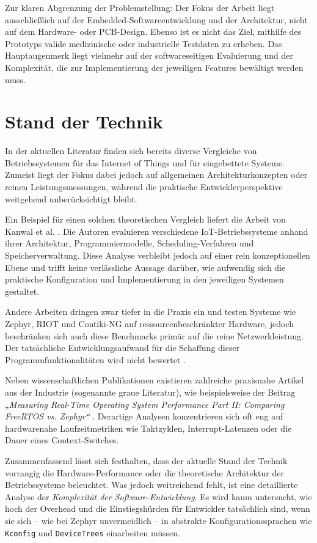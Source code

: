 Zur klaren Abgrenzung der Problemstellung: Der Fokus der Arbeit liegt ausschließlich auf der Embedded-Softwareentwicklung und der Architektur, nicht auf dem Hardware- oder PCB-Design. Ebenso ist es nicht das Ziel, mithilfe des Prototyps valide medizinische oder industrielle Testdaten zu erheben. Das Hauptaugenmerk liegt vielmehr auf der softwareseitigen Evaluierung und der Komplexität, die zur Implementierung der jeweiligen Features bewältigt werden muss.

\section{Stand der Technik}
\label{sec:Stand der Technik}
In der aktuellen Literatur finden sich bereits diverse Vergleiche von Betriebssystemen für das Internet of Things und für eingebettete Systeme. Zumeist liegt der Fokus dabei jedoch auf allgemeinen Architekturkonzepten oder reinen Leistungsmessungen, während die praktische Entwicklerperspektive weitgehend unberücksichtigt bleibt.

Ein Beispiel für einen solchen theoretischen Vergleich liefert die Arbeit von Kanwal et al. \cite{kanwal_iot_2023}. Die Autoren evaluieren verschiedene IoT-Betriebssysteme anhand ihrer Architektur, Programmiermodelle, Scheduling-Verfahren und Speicherverwaltung. Diese Analyse verbleibt jedoch auf einer rein konzeptionellen Ebene und trifft keine verlässliche Aussage darüber, wie aufwendig sich die praktische Konfiguration und Implementierung in den jeweiligen Systemen gestaltet.

Andere Arbeiten dringen zwar tiefer in die Praxis ein und testen Systeme wie Zephyr, RIOT und Contiki-NG auf ressourcenbeschränkter Hardware, jedoch beschränken sich auch diese Benchmarks primär auf die reine Netzwerkleistung. Der tatsächliche Entwicklungsaufwand für die Schaffung dieser Programmfunktionalitäten wird nicht bewertet \cite{silva_operating_2019}.

Neben wissenschaftlichen Publikationen existieren zahlreiche praxisnahe Artikel aus der Industrie (sogenannte graue Literatur), wie beispielsweise der Beitrag \textit{„Measuring Real-Time Operating System Performance Part II: Comparing FreeRTOS vs. Zephyr“} \cite{noauthor_measuring_nodate}. Derartige Analysen konzentrieren sich oft eng auf hardwarenahe Laufzeitmetriken wie Taktzyklen, Interrupt-Latenzen oder die Dauer eines Context-Switches.

Zusammenfassend lässt sich festhalten, dass der aktuelle Stand der Technik vorrangig die Hardware-Performance oder die theoretische Architektur der Betriebssysteme beleuchtet. Was jedoch weitreichend fehlt, ist eine detaillierte Analyse der \textit{Komplexität der Software-Entwicklung}. Es wird kaum untersucht, wie hoch der Overhead und die Einstiegshürden für Entwickler tatsächlich sind, wenn sie sich – wie bei Zephyr unvermeidlich – in abstrakte Konfigurationssprachen wie \texttt{Kconfig} und \texttt{DeviceTrees} einarbeiten müssen. 

